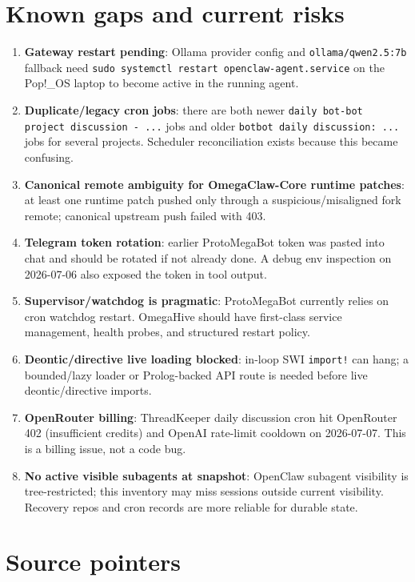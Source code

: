 \documentclass[11pt]{article}
\begin{document}
\section{Known gaps and current risks}

\begin{enumerate}[label=\arabic*.]
  \item \textbf{Gateway restart pending}: Ollama provider config and \texttt{ollama/qwen2.5:7b} fallback need \texttt{sudo systemctl restart openclaw-agent.service} on the Pop!\_OS laptop to become active in the running agent.
  \item \textbf{Duplicate/legacy cron jobs}: there are both newer \texttt{daily bot-bot project discussion - ...} jobs and older \texttt{botbot daily discussion: ...} jobs for several projects.  Scheduler reconciliation exists because this became confusing.
  \item \textbf{Canonical remote ambiguity for OmegaClaw-Core runtime patches}: at least one runtime patch pushed only through a suspicious/misaligned fork remote; canonical upstream push failed with 403.
  \item \textbf{Telegram token rotation}: earlier ProtoMegaBot token was pasted into chat and should be rotated if not already done.  A debug env inspection on 2026-07-06 also exposed the token in tool output.
  \item \textbf{Supervisor/watchdog is pragmatic}: ProtoMegaBot currently relies on cron watchdog restart.  OmegaHive should have first-class service management, health probes, and structured restart policy.
  \item \textbf{Deontic/directive live loading blocked}: in-loop SWI \texttt{import!} can hang; a bounded/lazy loader or Prolog-backed API route is needed before live deontic/directive imports.
  \item \textbf{OpenRouter billing}: ThreadKeeper daily discussion cron hit OpenRouter 402 (insufficient credits) and OpenAI rate-limit cooldown on 2026-07-07.  This is a billing issue, not a code bug.
  \item \textbf{No active visible subagents at snapshot}: OpenClaw subagent visibility is tree-restricted; this inventory may miss sessions outside current visibility.  Recovery repos and cron records are more reliable for durable state.
\end{enumerate}

\section{Source pointers}
\end{document}
